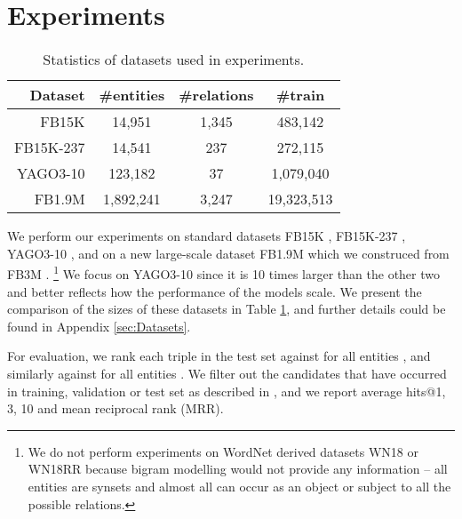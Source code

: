 \documentclass[11pt,a4paper, dvipsnames]{article}
\begin{document}
 \section{Experiments} \label{sec:experiments}

  \begin{table}[t!] \centering
    \small
    \begin{tabular}{r | c c c}
          \textbf{Dataset} & \textbf{\#entities} & \textbf{\#relations} & \textbf{\#train} \\
         \hline 
        FB15K & 14,951 & 1,345 & 483,142 \\
        \hline
        FB15K-237 & 14,541 & 237 & 272,115 \\
        \hline
        YAGO3-10 & 123,182 & 37 & 1,079,040 \\
        \hline
        FB1.9M & 1,892,241 & 3,247 & 19,323,513 \\
    \end{tabular}
    \caption{Statistics of datasets used in experiments.}
    \label{tab:datasets}
\end{table}

We perform our experiments on standard datasets FB15K \citep{Bordes2013TranslatingData}, FB15K-237 \citep{Toutanova2015RepresentingBases}, YAGO3-10 \citep{Dettmers2018ConvolutionalEmbeddings}, and on a new large-scale dataset FB1.9M which we construced from FB3M \citep{Xu2018InvestigationsExtraction}. \footnote{We do not perform experiments on WordNet derived datasets WN18 or WN18RR because bigram modelling would not provide any information -- all entities are synsets and almost all can occur as an object or subject to all the possible relations.} We focus on YAGO3-10 since it is 10 times larger than the other two and better reflects how the performance of the models scale. We present the comparison of the sizes of these datasets in Table \ref{tab:datasets}, and further details could be found in Appendix \ref{sec:Datasets}. 

For evaluation, we rank each triple  in the test set
against  for all entities , and similarly against  for all entities . We filter out the candidates that have occurred in training, validation or test set as described in \citet{Bordes2013TranslatingData}, and we report average hits@1, 3, 10 and mean reciprocal rank (MRR). 
 
\end{document}
